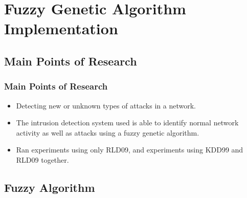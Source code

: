 \documentclass{beamer}
\newcommand{\linespace}{\vskip 0.25cm}
\begin{document}
\section[Fuzzy Genetic Algorithm Implementation]{Fuzzy Genetic Algorithm Implementation}

\subsection{Main Points of Research}
\begin{frame}
  \frametitle{Main Points of Research}
	\begin{itemize}
		\item Detecting new or unknown types of attacks in a network.
		\item The intrusion detection system used is able to identify normal network activity as well as attacks using a fuzzy genetic algorithm.
		
		\linespace
		\linespace
		
		\item Ran experiments using only RLD09, and experiments using KDD99 and RLD09 together.
	\end{itemize}
\end{frame}


\subsection{Fuzzy Algorithm}
\end{document}
